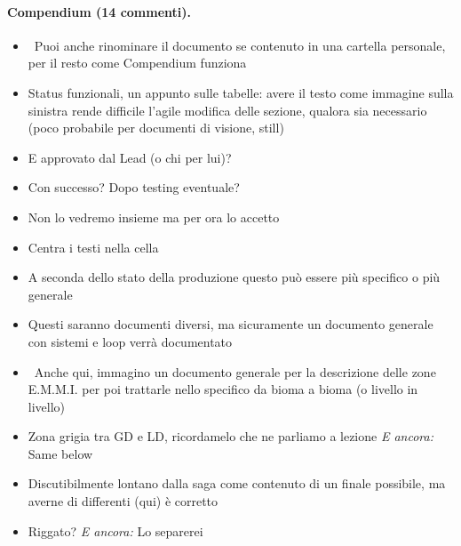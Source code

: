 \paragraph{Compendium (14 commenti).}
{\small
\begin{itemize}
  \item {} \rvBene\ Puoi anche rinominare il documento se contenuto in una cartella personale, per il resto come Compendium funziona
  \item {} Status funzionali, un appunto sulle tabelle: avere il testo come immagine sulla sinistra rende difficile l'agile modifica delle sezione, qualora sia necessario (poco probabile per documenti di visione, still)
  \item {} E approvato dal Lead (o chi per lui)?
  \item {} Con successo? Dopo testing eventuale?
  \item {} Non lo vedremo insieme ma per ora lo accetto
  \item {} Centra i testi nella cella
  \item {} A seconda dello stato della produzione questo può essere più specifico o più generale
  \item {} Questi saranno documenti diversi, ma sicuramente un documento generale con sistemi e loop verrà documentato
  \item {} \rvBene\ Anche qui, immagino un documento generale per la descrizione delle zone E.M.M.I. per poi trattarle nello specifico da bioma a bioma (o livello in livello)
  \item {} Zona grigia tra GD e LD, ricordamelo che ne parliamo a lezione \emph{E ancora:} Same below
  \item {} Discutibilmente lontano dalla saga come contenuto di un finale possibile, ma averne di differenti (qui) è corretto
  \item {} Riggato? \emph{E ancora:} Lo separerei
\end{itemize}
}
